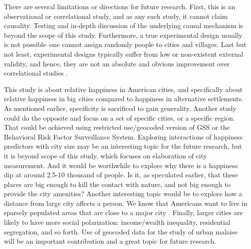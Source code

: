 \documentclass[12pt, letterpaper]{article}
\begin{document}
\begin{spacing}{1.9}


There are several limitations or directions for  future research. First, this is an
observational or correlational study, and as any such study, it cannot
claim causality. 
Testing and in-depth discussion of the underlying causal mechanism is beyond the
scope of this study. Furthermore, a true experimental design usually is
 not possible--one cannot assign randomly people to cities and villages. Last
 but not least, experimental designs typically suffer from low or non-existent external
 validity, and hence, they are not an absolute and obvious improvement over
 correlational studies \citep[e.g.,][]{pawson97}. %

This study is about relative happiness in American cities, and specifically
about relative happiness in big cities compared to happiness in alternative settlements.
As mentioned earlier, specificity is sacrificed 
 to gain generality. Another study could do the
opposite and focus on a set of specific cities, or a specific
region. That could
be achieved using restricted use/geocoded version of GSS or the Behavioral Risk
Factor Surveillance System.
%
Exploring interactions of happiness predictors with city size may be an interesting topic for the future
  research, but it is beyond scope of this study, which focuses on elaboration of city measurement.
% 
And it would be worthwhile to explore why there is
a happiness dip at around 2.5-10 thousand of people. Is it, as speculated
earlier, that these places are big enough to kill the contact with nature, and
not big enough to provide the city amenities?  Another interesting topic
would be to explore how a distance from large city affects a
person. We know that Americans want to live in sparsely populated
areas that are close to a major city \citep{fuguitt90,fuguitt75}.
%
Finally, larger cities are likely to have  more social polarization:
income/wealth inequality, residential segregation, and so
forth. %
 Use of geocoded
data for the study of urban malaise will be an important contribution 
and a great topic for future research. %




\end{spacing}
\end{document}
